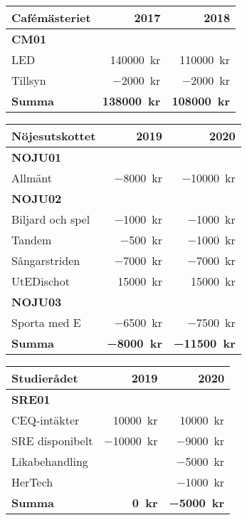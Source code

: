 \documentclass[../_main/handlingar.tex]{subfiles}
\begin{document}
\begin{tabularx}{10cm}{X r r}
    \textbf{\large Cafémästeriet} & \textbf{2017} & \textbf{2018} \\
    \hline
    \textbf{CM01} \\
    LED & \SI{140000}{kr} & \SI{110000}{kr} \\
    Tillsyn & \SI{-2000}{kr} & \SI{-2000}{kr} \\
    \hline
    \textbf{Summa} & \textbf{\SI{138000}{kr}} & \textbf{\SI{108000}{kr}} \\
\end{tabularx}

\begin{tabularx}{10cm}{X r r}
    \textbf{\large Nöjesutskottet} & \textbf{2019} & \textbf{2020} \\
    \hline
    \textbf{NOJU01} \\
    Allmänt & \SI{-8000}{kr} & \SI{-10000}{kr} \\
    \textbf{NOJU02} \\
    Biljard och spel & \SI{-1000}{kr} & \SI{-1000}{kr} \\
    Tandem & \SI{-500}{kr} & \SI{-1000}{kr} \\
    Sångarstriden & \SI{-7000}{kr} & \SI{-7000}{kr} \\
    UtEDischot & \SI{15000}{kr} & \SI{15000}{kr} \\
    \textbf{NOJU03} \\
    Sporta med E & \SI{-6500}{kr} & \SI{-7500}{kr} \\
    \hline
    \textbf{Summa} & \textbf{\SI{-8000}{kr}} & \textbf{\SI{-11500}{kr}} \\
\end{tabularx}

\begin{tabularx}{10cm}{X r r}
    \textbf{\large Studierådet} & \textbf{2019} & \textbf{2020} \\
    \hline
    \textbf{SRE01} \\
    CEQ-intäkter & \SI{10000}{kr} & \SI{10000}{kr} \\
    SRE disponibelt & \SI{-10000}{kr} & \SI{-9000}{kr} \\
    Likabehandling & & \SI{-5000}{kr} \\
    HerTech & & \SI{-1000}{kr} \\
    \hline
    \textbf{Summa} & \textbf{\SI{0}{kr}} & \textbf{\SI{-5000}{kr}} \\
\end{tabularx}
\end{document}
